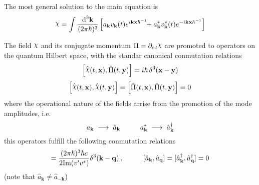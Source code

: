 The most general solution to the main equation is
\begin{equation}
	\rchi=\int\frac{\td^3\mathbf{k}}{(2\pi\hbar)^3}\left[a_\mathbf{k}v_\mathbf{k}(t)e^{i\mathbf{kx}\hbar^{-1}}\!\!+a_\mathbf{k}^*v_\mathbf{k}^*(t)e^{-i\mathbf{kx}\hbar^{-1}}\right]
\end{equation}


The field $\rchi$ and its conjugate momentum $\Pi=\partial_{c\,t} \rchi$ are promoted to operators on the quantum Hilbert space, with the standar canonical conmutation relations
\begin{equation}
	\left[\hat{\rchi}(t,\mathbf{x}),\hat{\Pi}(t,\mathbf{y})\right]=i\hbar \,\delta^3(\mathbf{x}-\mathbf{y})
\end{equation}
\begin{equation}
	\Big[\hat{\rchi}(t,\mathbf{x}),\hat{\rchi}(t,\mathbf{y})\Big]=\left[\hat{\Pi}(t,\mathbf{x}),\hat{\Pi}(t,\mathbf{y})\right]=0
\end{equation}
where the operational nature of the fields arrise from the promotion of the mode amplitudes, i.e.
\begin{equation}
	a_\mathbf{k}\;\longrightarrow\;\hat{a}_\mathbf{k}\hspace{1.0cm}a_\mathbf{k}^*\;\longrightarrow\;\hat{a}_\mathbf{k}^\dagger
\end{equation}
this operators fulfill the following conmutation relations
\begin{equation}
	[\hat{a}_\mathbf{k},\hat{a}_\mathbf{q}^\dagger]=\frac{(2\pi\hbar)^3\hbar c}{2\text{Im}(v'v^*)}\delta^3(\mathbf{k}-\mathbf{q})\,,\hspace{1.0cm}[\hat{a}_\mathbf{k},\hat{a}_\mathbf{q}]=[\hat{a}_\mathbf{k}^\dagger,\hat{a}_\mathbf{q}^\dagger]=0
\end{equation}
(note that $\hat{a}_\mathbf{k}\not=\hat{a}_{-\mathbf{k}}$)

